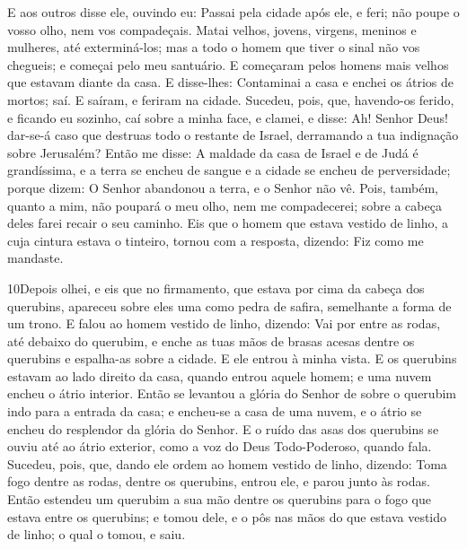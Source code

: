 E aos outros disse ele, ouvindo eu: Passai pela cidade após ele, e
feri; não poupe o vosso olho, nem vos compadeçais. Matai velhos,
jovens, virgens, meninos e mulheres, até exterminá-los; mas a todo o
homem que tiver o sinal não vos chegueis; e começai pelo meu
santuário. E começaram pelos homens mais velhos que estavam diante
da casa. E disse-lhes: Contaminai a casa e enchei os átrios de
mortos; saí. E saíram, e feriram na cidade. Sucedeu, pois, que,
havendo-os ferido, e ficando eu sozinho, caí sobre a minha face, e
clamei, e disse: Ah! Senhor Deus! dar-se-á caso que destruas todo o
restante de Israel, derramando a tua indignação sobre Jerusalém?
Então me disse: A maldade da casa de Israel e de Judá é
grandíssima, e a terra se encheu de sangue e a cidade se encheu de
perversidade; porque dizem: O Senhor abandonou a terra, e o Senhor
não vê. Pois, também, quanto a mim, não poupará o meu olho,
nem me compadecerei; sobre a cabeça deles farei recair o seu
caminho. Eis que o homem que estava vestido de linho, a cuja
cintura estava o tinteiro, tornou com a resposta, dizendo: Fiz como
me mandaste.

\medskip

\lettrine{10} Depois olhei, e eis que no firmamento, que
estava por cima da cabeça dos querubins, apareceu sobre eles uma
como pedra de safira, semelhante a forma de um trono. E falou ao
homem vestido de linho, dizendo: Vai por entre as rodas, até debaixo
do querubim, e enche as tuas mãos de brasas acesas dentre os
querubins e espalha-as sobre a cidade. E ele entrou à minha vista.
E os querubins estavam ao lado direito da casa, quando entrou
aquele homem; e uma nuvem encheu o átrio interior. Então se
levantou a glória do Senhor de sobre o querubim indo para a entrada
da casa; e encheu-se a casa de uma nuvem, e o átrio se encheu do
resplendor da glória do Senhor. E o ruído das asas dos querubins
se ouviu até ao átrio exterior, como a voz do Deus Todo-Poderoso,
quando fala. Sucedeu, pois, que, dando ele ordem ao homem
vestido de linho, dizendo: Toma fogo dentre as rodas, dentre os
querubins, entrou ele, e parou junto às rodas. Então estendeu um
querubim a sua mão dentre os querubins para o fogo que estava entre
os querubins; e tomou dele, e o pôs nas mãos do que estava vestido
de linho; o qual o tomou, e saiu.

